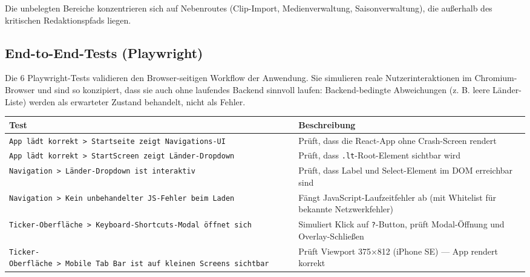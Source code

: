 Die unbelegten Bereiche konzentrieren sich auf Nebenroutes (Clip-Import,
Medienverwaltung, Saisonverwaltung), die außerhalb des kritischen
Redaktionspfads liegen.

\subsection{End-to-End-Tests
(Playwright)}\label{end-to-end-tests-playwright}

Die 6 Playwright-Tests validieren den Browser-seitigen Workflow der
Anwendung. Sie simulieren reale Nutzerinteraktionen im Chromium-Browser
und sind so konzipiert, dass sie auch ohne laufendes Backend sinnvoll
laufen: Backend-bedingte Abweichungen (z. B. leere Länder-Liste) werden
als erwarteter Zustand behandelt, nicht als Fehler.

{\def\LTcaptype{none} %
\begin{longtable}[]{@{}
  >{\raggedright\arraybackslash}p{}
  >{\raggedright\arraybackslash}p{}@{}}
\toprule\noalign{}
\begin{minipage}[b]{\linewidth}\raggedright
Test
\end{minipage} & \begin{minipage}[b]{\linewidth}\raggedright
Beschreibung
\end{minipage} \\
\midrule\noalign{}
\endhead
\bottomrule\noalign{}
\endlastfoot
\texttt{App\ lädt\ korrekt\ \textgreater{}\ Startseite\ zeigt\ Navigations-UI}
& Prüft, dass die React-App ohne Crash-Screen rendert \\
\texttt{App\ lädt\ korrekt\ \textgreater{}\ StartScreen\ zeigt\ Länder-Dropdown}
& Prüft, dass \texttt{.lt}-Root-Element sichtbar wird \\
\texttt{Navigation\ \textgreater{}\ Länder-Dropdown\ ist\ interaktiv} &
Prüft, dass Label und Select-Element im DOM erreichbar sind \\
\texttt{Navigation\ \textgreater{}\ Kein\ unbehandelter\ JS-Fehler\ beim\ Laden}
& Fängt JavaScript-Laufzeitfehler ab (mit Whitelist für bekannte
Netzwerkfehler) \\
\texttt{Ticker-Oberfläche\ \textgreater{}\ Keyboard-Shortcuts-Modal\ öffnet\ sich}
& Simuliert Klick auf \texttt{?}-Button, prüft Modal-Öffnung und
Overlay-Schließen \\
\texttt{Ticker-Oberfläche\ \textgreater{}\ Mobile\ Tab\ Bar\ ist\ auf\ kleinen\ Screens\ sichtbar}
& Prüft Viewport 375×812 (iPhone SE) --- App rendert korrekt \\
\end{longtable}
}

